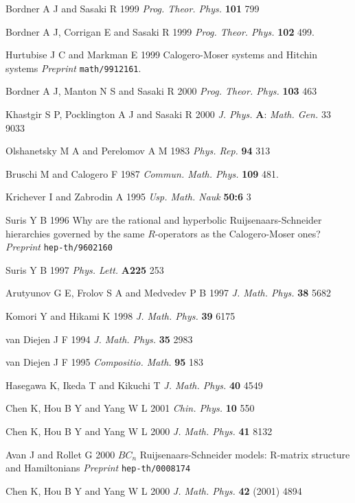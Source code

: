 \documentclass[a4paper,12pt]{article}
\begin{document}
\begin{thebibliography}{99}
  Bordner A J and Sasaki R 1999 \textit{Prog. Theor. Phys.}
\textbf{101} 799

  Bordner A J, Corrigan E and Sasaki R 1999 \textit{Prog.
Theor. Phys. }\textbf{102} 499.

  Hurtubise J C and Markman E 1999 Calogero-Moser systems and
Hitchin systems \textit{Preprint} \texttt{math/9912161}.

  Bordner A J, Manton N S and Sasaki R 2000 \textit{Prog.
Theor. Phys. }\textbf{103} 463

  Khastgir S P, Pocklington A J and Sasaki R 2000 \textit{J.
Phys.} \textbf{A}: \textit{Math. Gen. }33 9033

  Olshanetsky M A and Perelomov A M 1983 \textit{Phys. Rep.}
\textbf{94} 313

  Bruschi M and Calogero F 1987 \textit{Commun. Math. Phys.}
\textbf{109} 481.

  Krichever I and Zabrodin A 1995 \textit{Usp. Math. Nauk}
\textbf{50:6} 3

  Suris Y B 1996 Why are the rational and hyperbolic
Ruijsenaars-Schneider hierarchies governed by the same $R$-operators as the
Calogero-Moser ones? \textit{Preprint }\texttt{hep-th/9602160}

  Suris Y B 1997 \textit{Phys. Lett.} \textbf{A225} 253

  Arutyunov G E, Frolov S A and Medvedev P B 1997 \textit{J.
Math. Phys.} \textbf{38} 5682

  Komori Y and Hikami K 1998 \textit{J. Math. Phys.} \textbf{39}
6175

  van Diejen J F 1994 \textit{J. Math. Phys. }\textbf{35} 2983

  van Diejen J F 1995 \textit{Compositio. Math.} \textbf{95} 183

  Hasegawa K, Ikeda T and Kikuchi T \textit{J. Math. Phys.}
\textbf{40} 4549

  Chen K, Hou B Y and Yang W L 2001 \textit{Chin. Phys.} \textbf{10} 550

  Chen K, Hou B Y and Yang W L 2000 \textit{J. Math. Phys.}
\textbf{41} 8132

  Avan J and Rollet G 2000 $BC_{n}$ Ruijsenaars-Schneider
models: R-matrix structure and Hamiltonians \textit{Preprint}
\texttt{hep-th/0008174}

  Chen K, Hou B Y and Yang W L 2000 \textit{J. Math. Phys.}
\textbf{42} (2001) 4894




\end{thebibliography}
\end{document}
